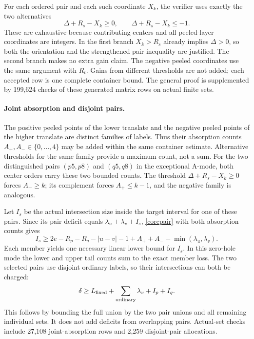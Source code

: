 \documentclass[11pt,a4paper]{article}
\begin{document}
For each ordered pair and each such coordinate $X_k$, the verifier uses
exactly the two alternatives
\[
 \Delta+R_s-X_k\ge0,\qquad \Delta+R_s-X_k\le-1.
\]
These are exhaustive because contributing centers and all peeled-layer
coordinates are integers. In the first branch $X_k>R_s$ already implies
$\Delta>0$, so both the orientation and the strengthened pair inequality
are justified. The second branch makes no extra gain claim. The negative
peeled coordinates use the same argument with $R_t$. Gains from different
thresholds are not added; each accepted row is one complete container bound.
The general proof is supplemented by 199,624 checks of these generated
matrix rows on actual finite sets.

\paragraph{Joint absorption and disjoint pairs.}
The positive peeled points of the lower translate and the negative peeled
points of the higher translate are distinct families of labels. Thus their
absorption counts $A_+,A_-\in\{0,\ldots,4\}$ may be added within the
same container estimate. Alternative thresholds for the same family provide
a maximum count, not a sum. For the two distinguished pairs $(p5,p8)$ and
$(q5,q8)$ in the exceptional A-mode, both center orders carry these two
bounded counts. The threshold $\Delta+R_s-X_k\ge0$ forces $A_+\ge k$;
its complement forces $A_+\le k-1$, and the negative family is analogous.

Let $I_s$ be the actual intersection size inside the target interval for
one of these pairs. Since its pair deficit equals $\lambda_u+\lambda_v+I_s$,
\eqref{corepair} with both absorption counts gives
\[
 I_s\ge2e-R_p-R_q-|u-v|-1+A_++A_- -\min(\lambda_u,\lambda_v).
\]
Each member yields one necessary linear lower bound for $I_s$. In this
zero-hole mode the lower and upper tail counts sum to the exact member loss.
The two selected pairs use disjoint ordinary labels, so their intersections
can both be charged:
\[
 \delta\ge L_{\rm fixed}+\sum_{\rm ordinary}\lambda_v+I_p+I_q.
\]
This follows by bounding the full union by the two pair unions and all
remaining individual sets. It does not add deficits from overlapping pairs.
Actual-set checks include 27,108 joint-absorption rows and 2,259 disjoint-pair
allocations.
\end{document}

